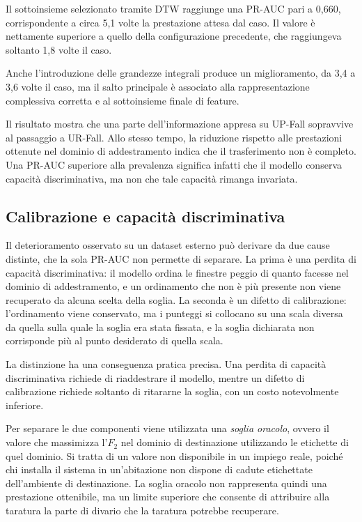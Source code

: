 Il sottoinsieme selezionato tramite DTW raggiunge una PR-AUC pari a 0,660, corrispondente a circa 5,1 volte la prestazione attesa dal caso. Il valore è nettamente superiore a quello della configurazione precedente, che raggiungeva soltanto 1,8 volte il caso.

Anche l'introduzione delle grandezze integrali produce un miglioramento, da 3,4 a 3,6 volte il caso, ma il salto principale è associato alla rappresentazione complessiva corretta e al sottoinsieme finale di feature.

Il risultato mostra che una parte dell'informazione appresa su UP-Fall sopravvive al passaggio a UR-Fall. Allo stesso tempo, la riduzione rispetto alle prestazioni ottenute nel dominio di addestramento indica che il trasferimento non è completo. Una PR-AUC superiore alla prevalenza significa infatti che il modello conserva capacità discriminativa, ma non che tale capacità rimanga invariata.

\subsection{Calibrazione e capacità discriminativa}
\label{sec:calibrazione}


Il deterioramento osservato su un dataset esterno può derivare da due cause distinte, che la sola PR-AUC non permette di separare. La prima è una perdita di capacità discriminativa: il modello ordina le finestre peggio di quanto facesse nel dominio di addestramento, e un ordinamento che non è più presente non viene recuperato da alcuna scelta della soglia. La seconda è un difetto di calibrazione: l'ordinamento viene conservato, ma i punteggi si collocano su una scala diversa da quella sulla quale la soglia era stata fissata, e la soglia dichiarata non corrisponde più al punto desiderato di quella scala.

La distinzione ha una conseguenza pratica precisa. Una perdita di capacità discriminativa richiede di riaddestrare il modello, mentre un difetto di calibrazione richiede soltanto di ritararne la soglia, con un costo notevolmente inferiore.

Per separare le due componenti viene utilizzata una \emph{soglia oracolo}, ovvero il valore che massimizza l'$F_2$ nel dominio di destinazione utilizzando le etichette di quel dominio. Si tratta di un valore non disponibile in un impiego reale, poiché chi installa il sistema in un'abitazione non dispone di cadute etichettate dell'ambiente di destinazione. La soglia oracolo non rappresenta quindi una prestazione ottenibile, ma un limite superiore che consente di attribuire alla taratura la parte di divario che la taratura potrebbe recuperare.

